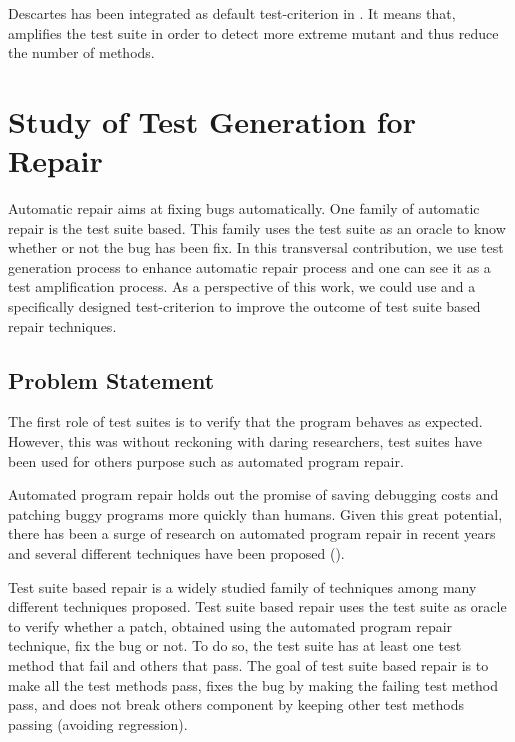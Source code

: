 Descartes has been integrated as default test-criterion in \dspot.
It means that, \dspot amplifies the test suite in order to detect more extreme mutant and thus reduce the number of \pseudotested methods.

\section{Study of Test Generation for Repair}
\label{sec:transversal-contributions:test-for-repair}

Automatic repair aims at fixing bugs automatically.
One family of automatic repair is the test suite based.
This family uses the test suite as an oracle to know whether or not the bug has been fix.
In this transversal contribution, we use test generation process to enhance automatic repair process and one can see it as a test amplification process.
As a perspective of this work, we could use \dspot and a specifically designed test-criterion to improve the outcome of test suite based repair techniques.

\subsection{Problem Statement}
\label{subsec:transversal-contributions:test-for-repair:introduction}

The first role of test suites is to verify that the program behaves as expected.
However, this was without reckoning with daring researchers, test suites have been used for others purpose such as automated program repair.

Automated program repair holds out the promise of saving debugging costs and patching buggy programs more quickly than humans. 
Given this great potential, there has been a surge of research on automated program repair in recent years and several different techniques have been proposed (\cite{genprog,semfix,nopol,tsepei,long2017automatic}).

Test suite based repair is a widely studied family of techniques among many different techniques proposed.
Test suite based repair uses the test suite as oracle to verify whether a patch, obtained using the automated program repair technique, fix the bug or not.
To do so, the test suite has at least one test method that fail and others that pass.
The goal of test suite based repair is to make all the test methods pass, \ie fixes the bug by making the failing test method pass, and does not break others component by keeping other test methods passing (avoiding regression).


